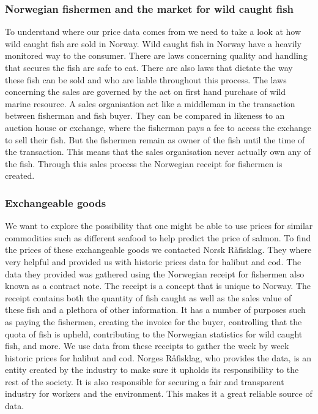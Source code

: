 \subsubsection{Norwegian fishermen and the market for wild caught fish}\label{Norwegian fishermen and the market for wild caught fish}
To understand where our price data comes from we need to take a look at how wild caught fish are sold in Norway. Wild caught fish in Norway have a heavily monitored way to the consumer. There are laws concerning quality and handling that secures the fish are safe to eat. There are also laws that dictate the way these fish can be sold and who are liable throughout this process. The laws concerning the sales are governed by the act on first hand purchase of wild marine resource. A sales organisation act like a middleman in the transaction between fisherman and fish buyer. They can be compared in likeness to an auction house or exchange, where the fisherman pays a fee to access the exchange to sell their fish. But the fishermen remain as owner of the fish until the time of the transaction. This means that the sales organisation never actually own any of the fish. Through this sales process the Norwegian receipt for fishermen is created.\parencite{Nielsen_2022}

\subsubsection{Exchangeable goods}\label{Exchangeable goods}
We want to explore the possibility that one might be able to use prices for similar commodities such as different seafood to help predict the price of salmon. To find the prices of these exchangeable goods we contacted Norsk Råfisklag. They where very helpful and provided us with historic prices data for halibut and cod. The data they provided was gathered using the Norwegian receipt for fishermen also known as a contract note. The receipt is a concept that is unique to Norway. The receipt contains both the quantity of fish caught as well as the sales value of these fish and a plethora of other information. It has a number of purposes such as paying the fishermen, creating the invoice for the buyer, controlling that the quota of fish is upheld, contributing to the Norwegian statistics for wild caught fish, and more. We use data from these receipts to gather the week by week historic prices for halibut and cod. Norges Råfisklag, who provides the data, is an entity created by the industry to make sure it upholds its responsibility to the rest of the society. It is also responsible for securing a fair and transparent industry for workers and the environment. This makes it a great reliable source of data.\parencite{Harland_2022}

